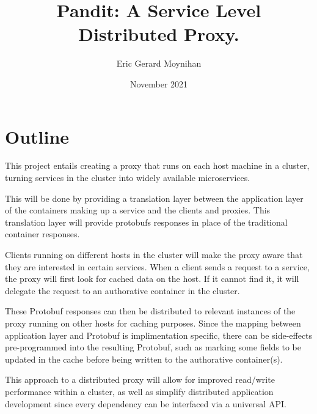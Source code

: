 \documentclass[12pt]{article}
\title{Pandit: A Service Level Distributed Proxy.}
\author{Eric Gerard Moynihan}
\date{November 2021}
\begin{document}
\maketitle

\section{Outline}
This project entails creating a proxy that runs on each host machine in a cluster, turning services in the cluster into widely available microservices. 

This will be done by providing a translation layer between the application layer of the containers making up a service and the clients and proxies.
This translation layer will provide protobufs responses in place of the traditional container responses.

Clients running on different hosts in the cluster will make the proxy aware that they are interested in certain services.
When a client sends a request to a service, the proxy will first look for cached data on the host. 
If it cannot find it, it will delegate the request to an authorative container in the cluster.

These Protobuf responses can then be distributed to relevant instances of the proxy running on other hosts for caching purposes.
Since the mapping between application layer and Protobuf is implimentation specific, there can be side-effects pre-programmed into the resulting Protobuf, such as marking some fields to be updated in the cache before being written to the authorative container(s).

This approach to a distributed proxy will allow for improved read/write performance within a cluster, as well as simplify distributed application development since every dependency can be interfaced via a universal API.
\end{document}
